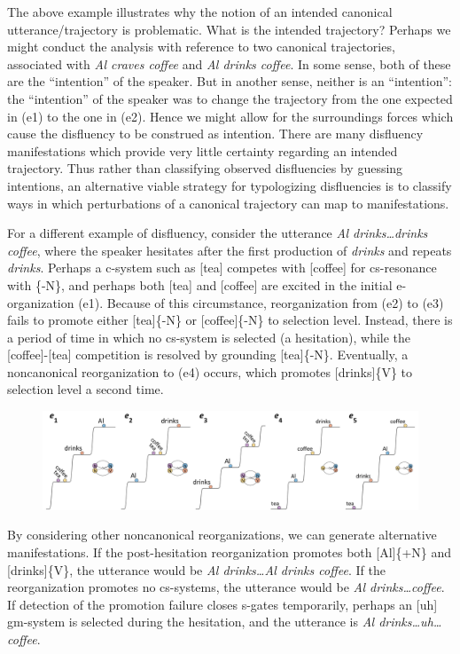   The above example illustrates why the notion of an intended canonical utterance/trajectory is problematic. What is the intended trajectory? Perhaps we might conduct the analysis with reference to two canonical trajectories, associated with \textit{Al craves coffee} and \textit{Al drinks coffee}. In some sense, both of these are the “intention” of the speaker. But in another sense, neither is an “intention”: the “intention” of the speaker was to change the trajectory from the one expected in (e1) to the one in (e2). Hence we might allow for the surroundings forces which cause the disfluency to be construed as intention. There are many disfluency manifestations which provide very little certainty regarding an intended trajectory. Thus rather than classifying observed disfluencies by guessing intentions, an alternative viable strategy for typologizing disfluencies is to classify ways in which perturbations of a canonical trajectory can map to manifestations.

  For a different example of disfluency, consider the utterance \textit{Al drinks…drinks coffee}, where the speaker hesitates after the first production of \textit{drinks} and repeats \textit{drinks}. Perhaps a c-system such as [tea] competes with [coffee] for cs-resonance with \{-N\}, and perhaps both [tea] and [coffee] are excited in the initial e-organization (e1). Because of this circumstance, reorganization from (e2) to (e3) fails to promote either [tea]\{-N\} or [coffee]\{-N\} to selection level. Instead, there is a period of time in which no cs-system is selected (a hesitation), while the [coffee]-[tea] competition is resolved by grounding [tea]\{-N\}. Eventually, a noncanonical reorganization to (e4) occurs, which promotes [drinks]\{V\} to selection level a second time. 

  
\begin{figure}
\includegraphics[width=\textwidth]{figures/Tilsen-img61.png}
\caption{\missingcaption}
\label{fig:}
\end{figure}
 

  By considering other noncanonical reorganizations, we can generate alternative manifestations. If the post-hesitation reorganization promotes both [Al]\{+N\} and [drinks]\{V\}, the utterance would be \textit{Al drinks…Al drinks coffee}. If the reorganization promotes no cs-systems, the utterance would be \textit{Al drinks…coffee}. If detection of the promotion failure closes s-gates temporarily, perhaps an [uh] gm-system is selected during the hesitation, and the utterance is \textit{Al drinks…uh…coffee}.

